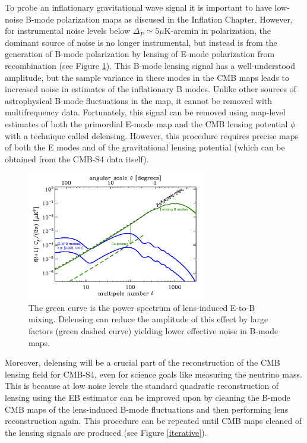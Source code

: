 To probe an inflationary gravitational wave signal it is important to have low-noise B-mode polarization maps as discused in the Inflation Chapter. However, for instrumental noise levels below $\Delta_P \simeq 5 \mu$K-arcmin in polarization, the dominant source of noise is no longer instrumental, but instead is from the generation of B-mode polarization by lensing of E-mode polarization from recombination (see Figure \ref{snowmssDelens}).  This B-mode lensing signal has a well-understood amplitude, but the sample variance in these modes in the CMB maps leads to increased noise in estimates of the inflationary B modes. Unlike other sources of astrophysical B-mode fluctuations in the map, it cannot be removed with multifrequency data.  Fortunately, this signal can be removed using map-level estimates of both the primordial E-mode map and the CMB lensing potential $\phi$ with a technique called delensing. However, this procedure requires
precise maps of both the E modes and of the gravitational lensing potential
(which can be obtained from the CMB-S4 data itself).

\begin{figure}[htbp]
\centering
\includegraphics[width=0.7\textwidth]{CMBLensing/cmb_powspec_for_s4scibooklensing.pdf}
\caption{The green curve is the power spectrum of lens-induced E-to-B mixing.  Delensing can reduce the amplitude of this effect by large factors (green dashed curve) yielding lower effective noise in B-mode maps.}
\label{snowmssDelens}
\end{figure}


Moreover, delensing will be a crucial part of the reconstruction of the CMB lensing field for CMB-S4, even for science goals like measuring the neutrino mass.  This is because at low noise levels the standard quadratic reconstruction of lensing using the EB estimator \cite{Hu:2001kj} can be improved upon by cleaning the B-mode CMB maps of the lens-induced B-mode fluctuations and then performing lens reconstruction again.  This procedure can be repeated until CMB maps cleaned of the lensing signals are produced (see Figure \ref{iterative}).  

